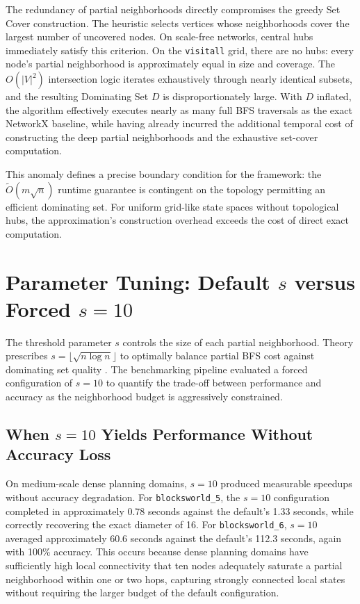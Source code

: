 The redundancy of partial neighborhoods directly compromises the greedy Set Cover construction. The heuristic selects vertices whose neighborhoods cover the largest number of uncovered nodes. On scale-free networks, central hubs immediately satisfy this criterion. On the \texttt{visitall} grid, there are no hubs: every node's partial neighborhood is approximately equal in size and coverage. The $O(|V|^2)$ intersection logic iterates exhaustively through nearly identical subsets, and the resulting Dominating Set $D$ is disproportionately large. With $D$ inflated, the algorithm effectively executes nearly as many full BFS traversals as the exact NetworkX baseline, while having already incurred the additional temporal cost of constructing the deep partial neighborhoods and the exhaustive set-cover computation.

This anomaly defines a precise boundary condition for the framework: the $\tilde{O}(m\sqrt{n})$ runtime guarantee is contingent on the topology permitting an efficient dominating set. For uniform grid-like state spaces without topological hubs, the approximation's construction overhead exceeds the cost of direct exact computation.

\section{Parameter Tuning: Default $s$ versus Forced $s = 10$}
\label{sec:paramtuning}

The threshold parameter $s$ controls the size of each partial neighborhood. Theory prescribes $s = \lfloor\sqrt{n \log n}\rfloor$ to optimally balance partial BFS cost against dominating set quality \cite{aingworth96}. The benchmarking pipeline evaluated a forced configuration of $s = 10$ to quantify the trade-off between performance and accuracy as the neighborhood budget is aggressively constrained.

\subsection{When $s = 10$ Yields Performance Without Accuracy Loss}

On medium-scale dense planning domains, $s = 10$ produced measurable speedups without accuracy degradation. For \texttt{blocksworld\_5}, the $s = 10$ configuration completed in approximately 0.78 seconds against the default's 1.33 seconds, while correctly recovering the exact diameter of 16. For \texttt{blocksworld\_6}, $s = 10$ averaged approximately 60.6 seconds against the default's 112.3 seconds, again with 100\% accuracy. This occurs because dense planning domains have sufficiently high local connectivity that ten nodes adequately saturate a partial neighborhood within one or two hops, capturing strongly connected local states without requiring the larger budget of the default configuration.


